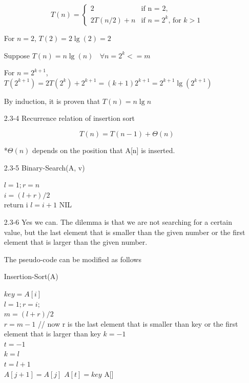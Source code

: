 \documentclass[]{article}
\begin{document}
\begin{enumerate}
\[T(n) = \begin{cases}
2&\text{if n = 2},\\
2T(n/2) + n&\text{if $n=2^k$, for $k>1$}
\end{cases}\]

\noindent
For $n=2$, $T(2) = 2 \lg(2) = 2$

Suppose $T(n) = n\lg(n)\ \ \ \  \forall n=2^k<=m$

For $n=2^{k+1}$, $ T(2^{k+1}) = 2T(2^{k}) + 2^{k+1} = (k+1)2^{k+1} = 2^{k+1}\lg(2^{k+1}) $

By induction, it is proven that $T(n) = n\lg n$

\item[2.3-4] Recurrence relation of insertion sort

$$T(n) = T(n-1) + \Theta(n)$$

*$\Theta(n)$ depends on the position that A[n] is inserted.

\item[2.3-5] Binary-Search(A, v)

\begin{algorithm}[H]
$l=1; r=n$\\

{$i=(l+r)/2$\\
 {
 	return i
 }
 {
 	$l=i+1$
 }
}
\Return NIL
\end{algorithm}

\item[2.3-6] Yes we can. The dilemma is that we are not searching for a certain value, but the last element that is smaller than the given number or the first element that is larger than the given number.

The pseudo-code can be modified as follows

Insertion-Sort(A)\\
\begin{algorithm}[H]
{
 $key=A[i]$\\
 $ l=1; r=i;$\\
 {	
 	$m=(l+r)/2$\\
 	{
 		$r=m-1$
 	}
 }
 // now r is the last element that is smaller than key or
 the first element that is larger than key
 $k=-1$\\
 $t=-1$\\
 {
 	$k=l$\\
 	$t=l+1$\\ 
 }
 {
 	$A[j+1]=A[j]$
 }
 $A[t]=key$
}
\Return A[]
\end{algorithm}


\end{enumerate}
\end{document}
